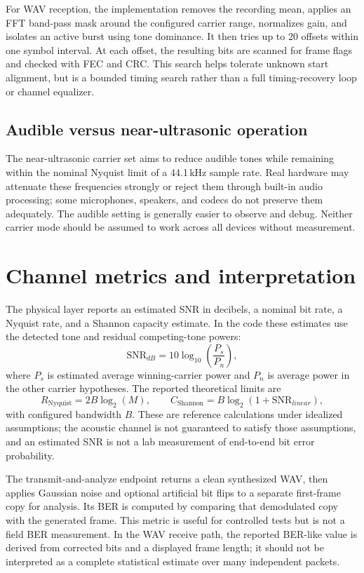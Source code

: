 \documentclass[11pt,a4paper]{article}
\begin{document}
For WAV reception, the implementation removes the recording mean, applies an FFT band-pass mask around the configured carrier range, normalizes gain, and isolates an active burst using tone dominance. It then tries up to 20 offsets within one symbol interval. At each offset, the resulting bits are scanned for frame flags and checked with FEC and CRC. This search helps tolerate unknown start alignment, but is a bounded timing search rather than a full timing-recovery loop or channel equalizer.

\subsection{Audible versus near-ultrasonic operation}
The near-ultrasonic carrier set aims to reduce audible tones while remaining within the nominal Nyquist limit of a 44.1\,kHz sample rate. Real hardware may attenuate these frequencies strongly or reject them through built-in audio processing; some microphones, speakers, and codecs do not preserve them adequately. The audible setting is generally easier to observe and debug. Neither carrier mode should be assumed to work across all devices without measurement.

\section{Channel metrics and interpretation}
\label{sec:metrics}

The physical layer reports an estimated SNR in decibels, a nominal bit rate, a Nyquist rate, and a Shannon capacity estimate. In the code these estimates use the detected tone and residual competing-tone powers:
\[
    \mathrm{SNR}_{dB}=10\log_{10}\!\left(\frac{P_s}{P_n}\right),
\]
where $P_s$ is estimated average winning-carrier power and $P_n$ is average power in the other carrier hypotheses. The reported theoretical limits are
\[
    R_{\mathrm{Nyquist}}=2B\log_2(M), \qquad
    C_{\mathrm{Shannon}}=B\log_2(1+\mathrm{SNR}_{linear}),
\]
with configured bandwidth $B$. These are reference calculations under idealized assumptions; the acoustic channel is not guaranteed to satisfy those assumptions, and an estimated SNR is not a lab measurement of end-to-end bit error probability.

The transmit-and-analyze endpoint returns a clean synthesized WAV, then applies Gaussian noise and optional artificial bit flips to a separate first-frame copy for analysis. Its BER is computed by comparing that demodulated copy with the generated frame. This metric is useful for controlled tests but is not a field BER measurement. In the WAV receive path, the reported BER-like value is derived from corrected bits and a displayed frame length; it should not be interpreted as a complete statistical estimate over many independent packets.
\end{document}
